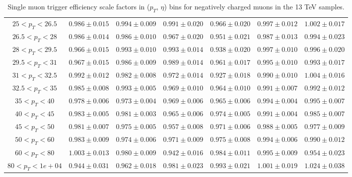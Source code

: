 \begin{table}
\begin{center}
{\begin{tabular}{ccccccc}
\hline \hline
$25<p_{T}<26.5$ & $0.986 \pm 0.015$ & $0.994 \pm 0.009$ & $0.991 \pm 0.020$ & $0.966 \pm 0.020$ & $0.997 \pm 0.012$ & $1.002 \pm 0.017$  \\
$26.5<p_{T}<28$ & $0.986 \pm 0.014$ & $0.986 \pm 0.010$ & $0.967 \pm 0.020$ & $0.951 \pm 0.021$ & $0.987 \pm 0.013$ & $0.994 \pm 0.023$  \\
$28<p_{T}<29.5$ & $0.966 \pm 0.015$ & $0.993 \pm 0.010$ & $0.993 \pm 0.014$ & $0.938 \pm 0.020$ & $0.997 \pm 0.010$ & $0.996 \pm 0.020$  \\
$29.5<p_{T}<31$ & $0.967 \pm 0.015$ & $0.986 \pm 0.009$ & $0.989 \pm 0.014$ & $0.961 \pm 0.017$ & $0.995 \pm 0.010$ & $0.993 \pm 0.017$  \\
$31<p_{T}<32.5$ & $0.992 \pm 0.012$ & $0.982 \pm 0.008$ & $0.972 \pm 0.014$ & $0.927 \pm 0.018$ & $0.990 \pm 0.010$ & $1.004 \pm 0.016$  \\
$32.5<p_{T}<35$ & $0.985 \pm 0.008$ & $0.993 \pm 0.005$ & $0.969 \pm 0.010$ & $0.964 \pm 0.010$ & $0.991 \pm 0.007$ & $0.992 \pm 0.012$  \\
$35<p_{T}<40$ & $0.978 \pm 0.006$ & $0.973 \pm 0.004$ & $0.969 \pm 0.006$ & $0.965 \pm 0.006$ & $0.994 \pm 0.004$ & $0.995 \pm 0.007$  \\
$40<p_{T}<45$ & $0.983 \pm 0.005$ & $0.981 \pm 0.003$ & $0.965 \pm 0.006$ & $0.974 \pm 0.005$ & $0.991 \pm 0.004$ & $0.985 \pm 0.007$  \\
$45<p_{T}<50$ & $0.981 \pm 0.007$ & $0.975 \pm 0.005$ & $0.957 \pm 0.008$ & $0.971 \pm 0.006$ & $0.988 \pm 0.005$ & $0.977 \pm 0.009$  \\
$50<p_{T}<60$ & $0.983 \pm 0.009$ & $0.974 \pm 0.006$ & $0.971 \pm 0.009$ & $0.975 \pm 0.008$ & $0.994 \pm 0.006$ & $0.990 \pm 0.012$  \\
$60<p_{T}<80$ & $1.003 \pm 0.013$ & $0.980 \pm 0.009$ & $0.942 \pm 0.016$ & $0.984 \pm 0.011$ & $0.995 \pm 0.009$ & $0.954 \pm 0.023$  \\
$80<p_{T}<1e+04$ & $0.944 \pm 0.031$ & $0.962 \pm 0.018$ & $0.981 \pm 0.023$ & $0.993 \pm 0.021$ & $1.001 \pm 0.019$ & $1.024 \pm 0.038$  \\
\hline
\end{tabular}}
\end{center}
\caption{Single muon trigger efficiency scale factors in ($p_T$, $\eta$) bins for negatively charged muons in the 13 TeV samples.}
\label{tab:Eff:mu:13TeV:HLT:neg}
\end{table}

